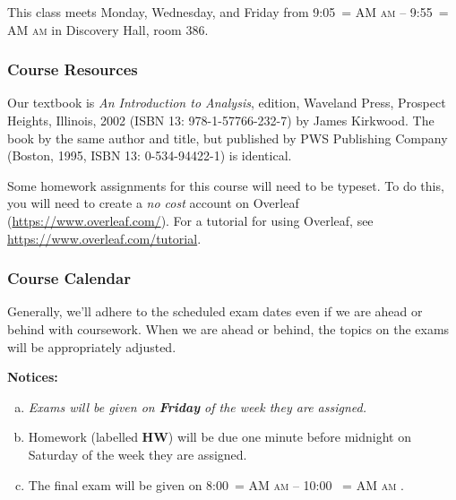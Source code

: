 \documentclass[12pt]{article}
\makeatletter
\newcounter{ex}\setcounter{ex}{0}
\newenvironment{alphalist}{
  \begin{enumerate}[(a)]
    \addtolength{\itemsep}{-0.5\itemsep}}
  {\end{enumerate}}
\DeclareRobustCommand{\maybefakesc}[1]{%
  \ifnum\pdfstrcmp{\f@series}{\bfdefault}=\z@
    {\fontsize{\dimexpr0.8\dimexpr\f@size pt\relax}{0}\selectfont\uppercase{#1}}%
  \else
    \textsc{#1}%
  \fi
}
\newcommand\AM{\,\maybefakesc{am}\xspace}
\newcommand{\room}{Discovery Hall, room  386}
\newcommand{\meetingtime}{This class meets Monday, Wednesday, and Friday  from 
	9:05\AM -- 9:55\AM}
\newcommand{\finaldateandtime}{\printdate{14/12/\the\year} 8:00\AM{} -- 10:00 \AM}
\makeatother
\begin{document}
\meetingtime in \room.

\subsubsection*{Course Resources}

Our textbook is \emph{An Introduction to Analysis},  edition, Waveland Press, Prospect Heights, Illinois, 2002 (ISBN 13: 978-1-57766-232-7) by James Kirkwood. The book by the same author and title, but published by PWS Publishing Company (Boston, 1995, ISBN 13:
0-534-94422-1) is identical.

 Some homework assignments for this course will need to be typeset. To do this, you will need to create a \emph{no cost} 
account on Overleaf (\url{https://www.overleaf.com/}).   For a  tutorial for using Overleaf, see \url{https://www.overleaf.com/tutorial}.



\subsubsection*{Course Calendar}

Generally, we'll adhere to the scheduled exam dates even if we are ahead or behind with coursework.  
When we are ahead or behind, the topics on the exams will be appropriately adjusted.  


\vspace{0.1in}
\noindent \textbf{Notices:}


\begin{alphalist}
   \item \emph{Exams will be given on  \textbf{Friday} of the week they are assigned.}
   

    \item Homework (labelled \textbf{HW}) will be due one minute before midnight on  Saturday of the week they are assigned.  

    \item The final exam will be given on \finaldateandtime.
    
\end{alphalist}

\vspace{0.1in}
\end{document}
